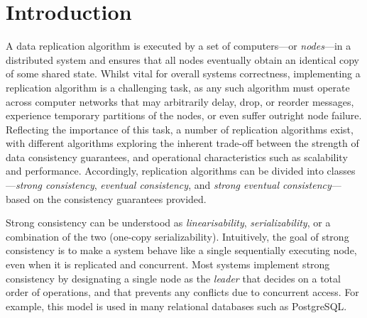 \documentclass[acmlarge,review,anonymous]{acmart}\settopmatter{printfolios=true}
\begin{document}


\maketitle



\section{Introduction}
\label{sect.introduction}

A data replication algorithm is executed by a set of computers---or \emph{nodes}---in a distributed system and ensures that all nodes eventually obtain an identical copy of some shared state.
Whilst vital for overall systems correctness, implementing a replication algorithm is a challenging task, as any such algorithm must operate across computer networks that may arbitrarily delay, drop, or reorder messages, experience temporary partitions of the nodes, or even suffer outright node failure.
Reflecting the importance of this task, a number of replication algorithms exist, with different algorithms exploring the inherent trade-off between the strength of data consistency guarantees, and operational characteristics such as scalability and performance.
Accordingly, replication algorithms can be divided into classes---\emph{strong consistency}, \emph{eventual consistency}, and \emph{strong eventual consistency}---based on the consistency guarantees provided.

Strong consistency can be understood as \emph{linearisability}, \emph{serializability}, or a combination of the two (one-copy serializability).
Intuitively, the goal of strong consistency is to make a system behave like a single sequentially executing node, even when it is replicated and concurrent.
Most systems implement strong consistency by designating a single node as the \emph{leader} that decides on a total order of operations, and that prevents any conflicts due to concurrent access.
For example, this model is used in many relational databases such as PostgreSQL.
\end{document}
